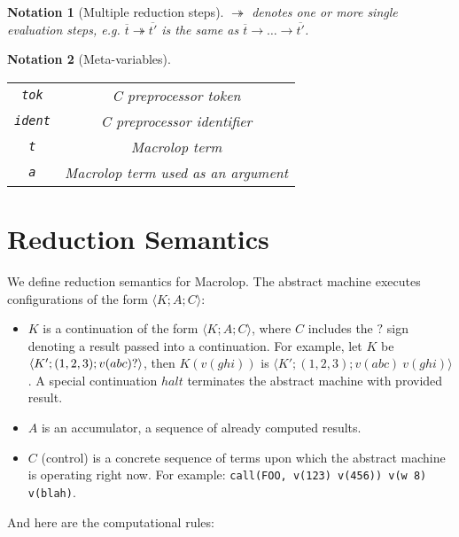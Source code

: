 \documentclass[12pt]{article}
\theoremstyle{break}
\newtheorem{notation}{Notation}
\begin{document}
\begin{notation}[Multiple reduction steps]
    $\twoheadrightarrow$ denotes one or more single evaluation steps, e.g.
    $\overline{t} \twoheadrightarrow \overline{t'}$ is the same as
    $\overline{t} \to \ldots \to \overline{t'}$.
\end{notation}

\begin{notation}[Meta-variables]
    \ \\
    \begin{tabular}{|c|c|}
        \hline
        \texttt{tok} & C preprocessor token \\
        \texttt{ident} & C preprocessor identifier \\
        \texttt{t} & Macrolop term \\
        \texttt{a} & Macrolop term used as an argument \\
        \hline
    \end{tabular}
\end{notation}

\section{Reduction Semantics}

We define reduction semantics for Macrolop. The abstract machine executes configurations
of the form $\langle K; A; C \rangle$:

\begin{itemize}
    \item $K$ is a continuation of the form $\langle K; A; C \rangle$, where
    $C$ includes the $?$ sign denoting a result passed into a continuation.
    For example, let $K$ be $\langle K'; (1, 2, 3); v(abc) \\ ? \rangle$,
    then $K(v(ghi))$ is $\langle K'; (1, 2, 3); v(abc) \ v(ghi) \rangle$. A special
    continuation $halt$ terminates the abstract machine with provided result.

    \item $A$ is an accumulator, a sequence of already computed
    results.

    \item $C$ (control) is a concrete sequence of terms upon which the abstract
    machine is operating right now. For example: \texttt{call(FOO, v(123) v(456)) v(w 8) v(blah)}.
\end{itemize}

And here are the computational rules:
\end{document}
